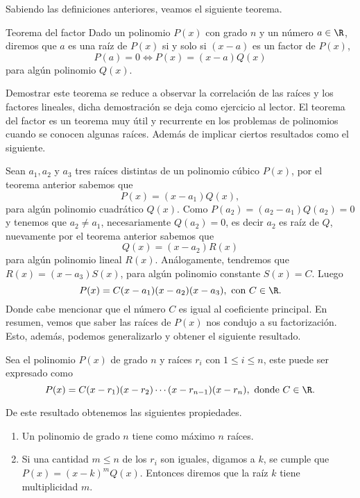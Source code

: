 Sabiendo las definiciones anteriores, veamos el siguiente teorema.

\begin{theorem.tcb}{Teorema del factor}{}\label{factor-theorem}
Dado un polinomio $P(x)$ con grado $n$ y un número $a \in \R$, diremos que $a$ es una raíz de $P(x)$ si y solo si $(x - a)$ es un factor de $P(x)$, \ie
\[
    P(a) = 0 \iff P(x) = (x - a)Q(x)
\]
para algún polinomio $Q(x)$.
\end{theorem.tcb}
Demostrar este teorema se reduce a observar la correlación de las raíces y los factores lineales, dicha demostración se deja como ejercicio al lector.
El teorema del factor es un teorema muy útil y recurrente en los problemas de polinomios cuando se conocen algunas raíces.
Además de implicar ciertos resultados como el siguiente.

Sean $a_1, a_2$ y $a_3$ tres raíces distintas de un polinomio cúbico $P(x)$, por el teorema anterior sabemos que
\[
    P(x) = (x - a_1)Q(x),
\]
para algún polinomio cuadrático $Q(x)$.
Como $P(a_2) = (a_2 - a_1)Q(a_2) = 0$ y tenemos que $a_2 \neq a_1$, necesariamente $Q(a_2) = 0$, es decir $a_2$ es raíz de $Q$, nuevamente por el teorema anterior sabemos que
\[
    Q(x) = (x - a_2)R(x)
\]
para algún polinomio lineal $R(x)$.
Análogamente, tendremos que $R(x) = (x - a_3)S(x)$, para algún polinomio constante $S(x) = C$.
Luego
\[
    P(x) = C(x - a_1)(x - a_2)(x - a_3),\ \text{con}\  C \in \R.
\]
Donde cabe mencionar que el número $C$ es igual al coeficiente principal.
En resumen, vemos que saber las raíces de $P(x)$ nos condujo a su factorización.
Esto, además, podemos generalizarlo y obtener el siguiente resultado.
\begin{remark.tcb}
    Sea el polinomio $P(x)$ de grado $n$ y raíces $r_i$ con $1 \leq i \leq n$, este puede ser expresado como
    \begin{equation}
        P(x) = C(x - r_1)(x - r_2)\cdots(x - r_{n-1})(x - r_n), \ \text{donde}\ C \in \R.\label{eq:equation}
    \end{equation}
\end{remark.tcb}
De este resultado obtenemos las siguientes propiedades.
\begin{enumerate}
    \item Un polinomio de grado $n$ tiene como máximo $n$ raíces.
    \item Si una cantidad $m \leq n$ de los $r_i$ son iguales, digamos a $k$, se cumple que $P(x) = (x - k)^m Q(x)$.
    Entonces diremos que la raíz $k$ tiene multiplicidad $m$.
\end{enumerate}

